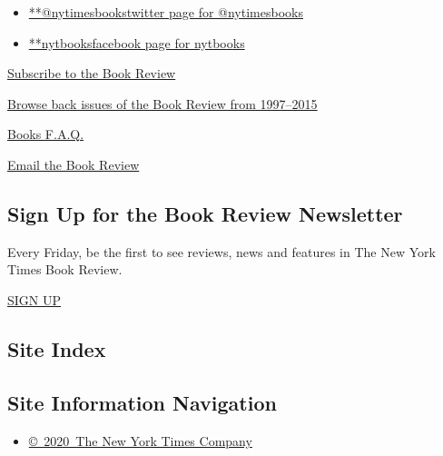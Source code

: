 \begin{itemize}
\tightlist
\item
  \href{https://twitter.com/nytimesbooks}{**@nytimesbookstwitter page
  for @nytimesbooks}
\item
  \href{https://www.facebook.com/nytbooks}{**nytbooksfacebook page for
  nytbooks}
\end{itemize}

\href{https://homedelivery.nytimes.com/HDS/BookReviewHome.do?mode=BookReviewHome\&ref=review}{Subscribe
to the Book Review}

\href{https://www.nytimes.com/2014/07/29/books/review/the-new-york-times-book-review-back-issues.html}{Browse
back issues of the Book Review from 1997--2015}

\href{https://www.nytimes.com/membercenter/faq/books.html?ref=review}{Books
F.A.Q.}

\href{mailto:books@nytimes.com}{Email the Book Review}

\hypertarget{sign-up-for-the-book-review-newsletter}{%
\subsection{Sign Up for the Book Review
Newsletter}\label{sign-up-for-the-book-review-newsletter}}

Every Friday, be the first to see reviews, news and features in The New
York Times Book Review.

\href{/newsletters/signup/BK}{SIGN UP}

\hypertarget{site-index}{%
\subsection{Site Index}\label{site-index}}

\hypertarget{site-information-navigation}{%
\subsection{Site Information
Navigation}\label{site-information-navigation}}

\begin{itemize}
\tightlist
\item
  \href{https://help.nytimes.com/hc/en-us/articles/115014792127-Copyright-notice}{©~2020~The
  New York Times Company}
\end{itemize}

